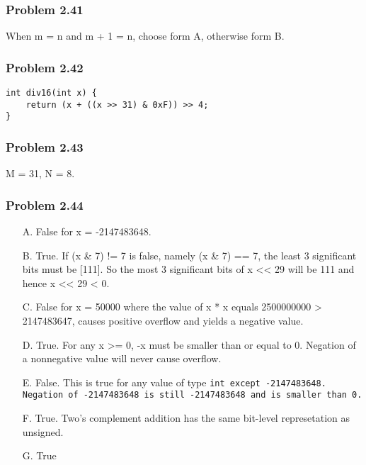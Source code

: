 \documentclass[a4paper]{article}
\begin{document}
\subsubsection*{Problem 2.41}
When m = n and m + 1 = n, choose form A, otherwise form B.

\subsubsection*{Problem 2.42}
\begin{lstlisting}
int div16(int x) {
    return (x + ((x >> 31) & 0xF)) >> 4;
}
\end{lstlisting}

\subsubsection*{Problem 2.43}
M = 31, N = 8.

\subsubsection*{Problem 2.44}
\begin{enumerate}
    \item [A.] False for x = -2147483648.
    \item [B.] True. If (x \& 7) != 7 is false, namely (x 
    \& 7) == 7, the least 3 significant bits must be [111]. So the most 3 significant bits of x << 29 will be 111 and hence x << 29 < 0.
    \item [C.] False for x = 50000 where the value of x * x equals 2500000000 > 2147483647, causes positive overflow and yields a negative value.
    \item [D.] True. For any x >= 0, -x must be smaller than or equal to 0. Negation of a nonnegative value will never cause overflow.
    \item [E.] False. This is true for any value of type \tt{int} \rm{except} -2147483648. Negation of -2147483648 is still -2147483648 and is smaller than 0.
    \item [F.] True. Two's complement addition has the same bit-level represetation as unsigned.
    \item [G.] True
\end{enumerate}

\end{document}

